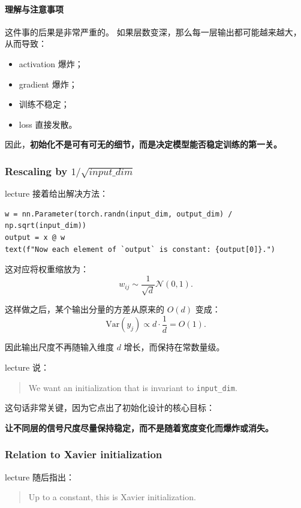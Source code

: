 \documentclass[a4paper,UTF8]{article}
\numberwithin{equation}{section}
\begin{document}
\paragraph{理解与注意事项}
这件事的后果是非常严重的。  
如果层数变深，那么每一层输出都可能越来越大，从而导致：
\begin{itemize}
    \item activation 爆炸；
    \item gradient 爆炸；
    \item 训练不稳定；
    \item loss 直接发散。
\end{itemize}

因此，\textbf{初始化不是可有可无的细节，而是决定模型能否稳定训练的第一关。}

\subsubsection{Rescaling by \(1/\sqrt{input\_dim}\)}

lecture 接着给出解决方法：
\begin{verbatim}
w = nn.Parameter(torch.randn(input_dim, output_dim) / np.sqrt(input_dim))
output = x @ w
text(f"Now each element of `output` is constant: {output[0]}.")
\end{verbatim}

这对应将权重缩放为：
\[
w_{ij} \sim \frac{1}{\sqrt{d}}\mathcal{N}(0,1).
\]

这样做之后，某个输出分量的方差从原来的 \(O(d)\) 变成：
\[
\mathrm{Var}(y_j) \propto d \cdot \frac{1}{d} = O(1).
\]

因此输出尺度不再随输入维度 \(d\) 增长，而保持在常数量级。

lecture 说：
\begin{quote}
We want an initialization that is invariant to \verb|input_dim|.
\end{quote}

这句话非常关键，因为它点出了初始化设计的核心目标：
\begin{center}
\textbf{让不同层的信号尺度尽量保持稳定，而不是随着宽度变化而爆炸或消失。}
\end{center}

\subsubsection{Relation to Xavier initialization}

lecture 随后指出：
\begin{quote}
Up to a constant, this is Xavier initialization.
\end{quote}
\end{document}
